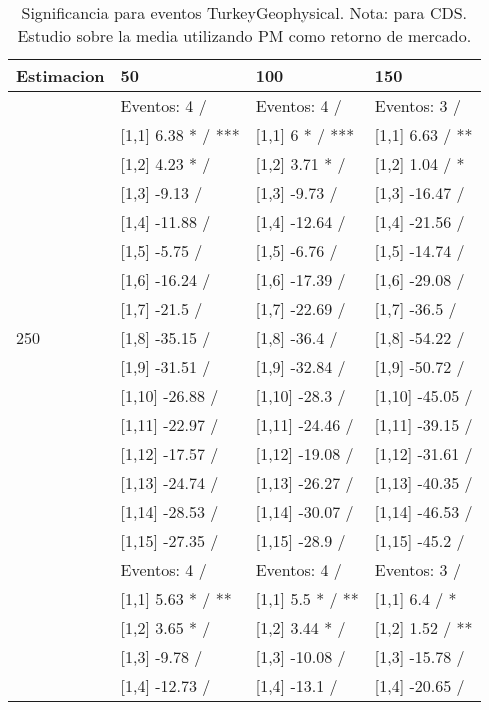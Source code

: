 \begin{table}

\caption{Significancia para eventos TurkeyGeophysical. Nota: para CDS. Estudio sobre la media utilizando PM como retorno de mercado.}
\centering
\begin{tabular}[t]{llll}
\toprule
Estimacion & 50 & 100 & 150\\
\midrule
 & Eventos:  4 / & Eventos:  4 / & Eventos:  3 /\\
 & {}[1,1] 6.38 * / *** & {}[1,1] 6 * / *** & {}[1,1] 6.63  / **\\
 & {}[1,2] 4.23 * / & {}[1,2] 3.71 * / & {}[1,2] 1.04  / *\\
 & {}[1,3] -9.13  / & {}[1,3] -9.73  / & {}[1,3] -16.47  /\\
 & {}[1,4] -11.88  / & {}[1,4] -12.64  / & {}[1,4] -21.56  /\\
\addlinespace
 & {}[1,5] -5.75  / & {}[1,5] -6.76  / & {}[1,5] -14.74  /\\
 & {}[1,6] -16.24  / & {}[1,6] -17.39  / & {}[1,6] -29.08  /\\
 & {}[1,7] -21.5  / & {}[1,7] -22.69  / & {}[1,7] -36.5  /\\
250 & {}[1,8] -35.15  / & {}[1,8] -36.4  / & {}[1,8] -54.22  /\\
 & {}[1,9] -31.51  / & {}[1,9] -32.84  / & {}[1,9] -50.72  /\\
\addlinespace
 & {}[1,10] -26.88  / & {}[1,10] -28.3  / & {}[1,10] -45.05  /\\
 & {}[1,11] -22.97  / & {}[1,11] -24.46  / & {}[1,11] -39.15  /\\
 & {}[1,12] -17.57  / & {}[1,12] -19.08  / & {}[1,12] -31.61  /\\
 & {}[1,13] -24.74  / & {}[1,13] -26.27  / & {}[1,13] -40.35  /\\
 & {}[1,14] -28.53  / & {}[1,14] -30.07  / & {}[1,14] -46.53  /\\
\addlinespace
 & {}[1,15] -27.35  / & {}[1,15] -28.9  / & {}[1,15] -45.2  /\\
 & Eventos:  4 / & Eventos:  4 / & Eventos:  3 /\\
 & {}[1,1] 5.63 * / ** & {}[1,1] 5.5 * / ** & {}[1,1] 6.4  / *\\
 & {}[1,2] 3.65 * / & {}[1,2] 3.44 * / & {}[1,2] 1.52  / **\\
 & {}[1,3] -9.78  / & {}[1,3] -10.08  / & {}[1,3] -15.78  /\\
\addlinespace
 & {}[1,4] -12.73  / & {}[1,4] -13.1  / & {}[1,4] -20.65  /\\

\end{tabular}
\end{table}
